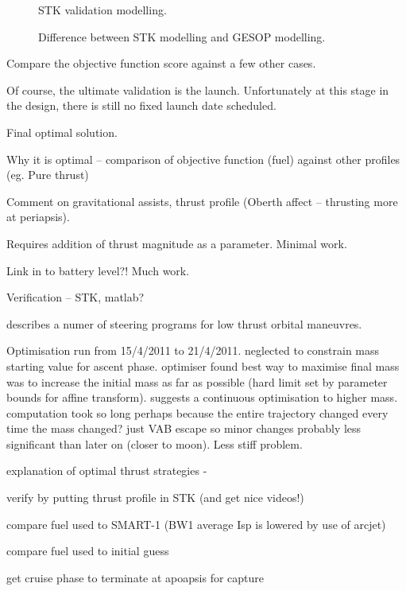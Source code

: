 \begin{figure}
\centering
\caption{STK validation modelling.}
\label{fig:STK-verification}
\end{figure}

\begin{figure}
\centering
\caption{Difference between STK modelling and GESOP modelling.}
\label{fig:STK-error}
\end{figure}

Compare the objective function score against a few other cases.

Of course, the ultimate validation is the launch. Unfortunately at this stage in the design, there is still no fixed launch date scheduled.

Final optimal solution.

Why it is optimal – comparison of objective function (fuel) against other profiles (eg. Pure thrust)

Comment on gravitational assists, thrust profile (Oberth affect – thrusting more at periapsis).

Requires addition of thrust magnitude as a parameter. Minimal work.

Link in to battery level?! Much work.

Verification – STK, matlab?

\textcite{Pollard2000} describes a numer of steering programs for low thrust orbital maneuvres.

Optimisation run from 15/4/2011 to 21/4/2011. neglected to constrain mass starting value for ascent phase. optimiser found best way to maximise final mass was to increase the initial mass as far as possible (hard limit set by parameter bounds for affine transform). suggests a continuous optimisation to higher mass. computation took so long perhaps because the entire trajectory changed every time the mass changed? just VAB escape so minor changes probably less significant than later on (closer to moon). Less stiff problem.

explanation of optimal thrust strategies - \textcite{Herbiniere2000}

verify by putting thrust profile in STK (and get nice videos!)

compare fuel used to SMART-1 (BW1 average Isp is lowered by use of arcjet)

compare fuel used to initial guess

get cruise phase to terminate at apoapsis for capture

